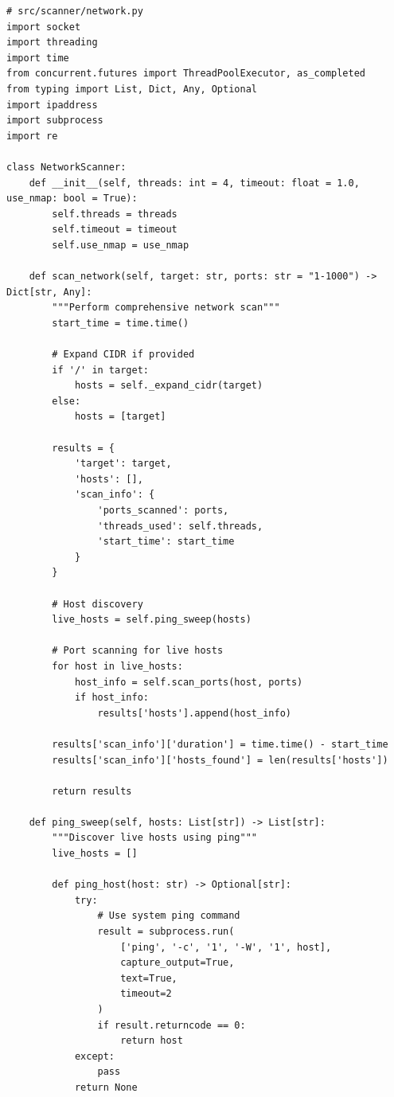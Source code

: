 \documentclass[12pt,a4paper]{report}
\begin{document}
\begin{lstlisting}[caption=Network Scanner Source Code]
# src/scanner/network.py
import socket
import threading
import time
from concurrent.futures import ThreadPoolExecutor, as_completed
from typing import List, Dict, Any, Optional
import ipaddress
import subprocess
import re

class NetworkScanner:
    def __init__(self, threads: int = 4, timeout: float = 1.0, use_nmap: bool = True):
        self.threads = threads
        self.timeout = timeout
        self.use_nmap = use_nmap
        
    def scan_network(self, target: str, ports: str = "1-1000") -> Dict[str, Any]:
        """Perform comprehensive network scan"""
        start_time = time.time()
        
        # Expand CIDR if provided
        if '/' in target:
            hosts = self._expand_cidr(target)
        else:
            hosts = [target]
        
        results = {
            'target': target,
            'hosts': [],
            'scan_info': {
                'ports_scanned': ports,
                'threads_used': self.threads,
                'start_time': start_time
            }
        }
        
        # Host discovery
        live_hosts = self.ping_sweep(hosts)
        
        # Port scanning for live hosts
        for host in live_hosts:
            host_info = self.scan_ports(host, ports)
            if host_info:
                results['hosts'].append(host_info)
        
        results['scan_info']['duration'] = time.time() - start_time
        results['scan_info']['hosts_found'] = len(results['hosts'])
        
        return results
    
    def ping_sweep(self, hosts: List[str]) -> List[str]:
        """Discover live hosts using ping"""
        live_hosts = []
        
        def ping_host(host: str) -> Optional[str]:
            try:
                # Use system ping command
                result = subprocess.run(
                    ['ping', '-c', '1', '-W', '1', host],
                    capture_output=True,
                    text=True,
                    timeout=2
                )
                if result.returncode == 0:
                    return host
            except:
                pass
            return None
        

\end{lstlisting}
\end{document}
